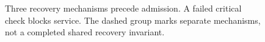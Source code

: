 \begin{figure}[H]
\centering
{}
\caption{Three recovery mechanisms precede admission. A failed critical check blocks service. The dashed group marks separate mechanisms, not a completed shared recovery invariant.}
\label{fig:swk-recovery-pipeline}
\end{figure}

